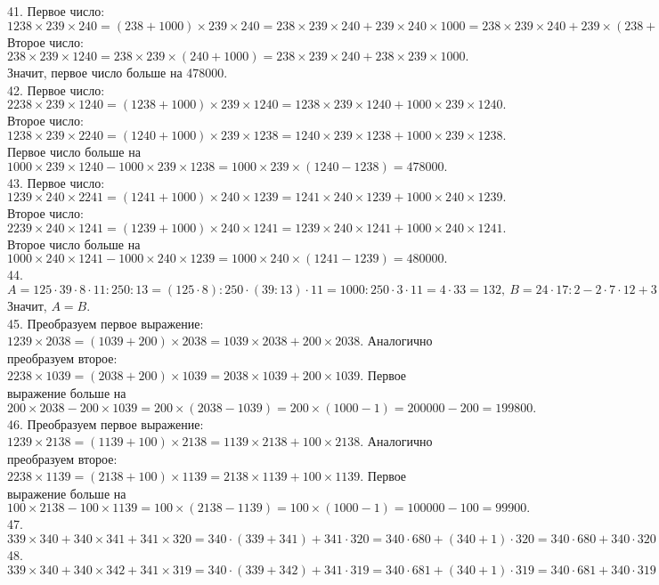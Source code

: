 41. Первое число: $1238\times239\times240=(238+1000)\times239\times240=238\times239\times240+239\times240\times1000=238\times239\times240+239\times(238+2)\times1000=
238\times239\times240+239\times238\times1000+239\times2\times1000=238\times239\times240+239\times238\times1000+478000.$ Второе число: $238\times239\times1240=238\times239\times(240+1000)=238\times239\times240+238\times239\times1000.$ Значит, первое число больше на 478000.\\
42. Первое число: $2238\times239\times1240=(1238+1000)\times239\times1240=
1238\times239\times1240+1000\times239\times1240.$ Второе число:
$1238\times239\times2240=(1240+1000)\times239\times1238=1240\times239\times1238+
1000\times239\times1238.$ Первое число больше на $1000\times239\times1240-1000\times239\times1238=1000\times239\times(1240-1238)=478000.$\\
43. Первое число: $1239\times240\times2241=(1241+1000)\times240\times1239=1241\times240\times1239+1000\times240\times1239.$ Второе число: $2239\times240\times1241=(1239+1000)\times240\times1241=
1239\times240\times1241+1000\times240\times1241.$ Второе число больше на
 $1000\times240\times1241-1000\times240\times1239=1000\times240\times(1241-1239)=480000.$\\
44. $A=125\cdot39\cdot8\cdot11:250:13=(125\cdot8):250\cdot(39:13)\cdot11=1000:250\cdot3\cdot11=4\cdot33=132,\ B=24\cdot17:2-2\cdot7\cdot12+3\cdot45\cdot4-(5+7)\cdot37=17\cdot12-14\cdot12+45\cdot12-37\cdot12=12\cdot(17-14+45-37)=12\cdot11=132.$ Значит, $A=B.$\\
45. Преобразуем первое выражение: $1239\times2038=(1039+200)\times2038=1039\times2038+200\times2038.$ Аналогично преобразуем второе:
$2238\times1039=(2038+200)\times1039=2038\times1039+200\times1039.$ Первое выражение больше на $200\times2038-200\times1039=
200\times(2038-1039)=200\times(1000-1)=200000-200=199800.$\\
46. Преобразуем первое выражение: $1239\times2138=(1139+100)\times2138=1139\times2138+100\times2138.$ Аналогично преобразуем второе:
$2238\times1139=(2138+100)\times1139=2138\times1139+100\times1139.$ Первое выражение больше на $100\times2138-100\times1139=
100\times(2138-1139)=100\times(1000-1)=100000-100=99900.$\\
47. $339 \times 340 + 340 \times 341 + 341 \times 320=
340\cdot(339+341)+341\cdot320=340\cdot680+(340+1)\cdot320=
340\cdot680+340\cdot320+1\cdot320=340\cdot(680+320)+320=
340\cdot1000+320=340320.$\\
48. $339 \times 340 + 340 \times 342 + 341 \times 319=
340\cdot(339+342)+341\cdot319=340\cdot681+(340+1)\cdot319=
340\cdot681+340\cdot319+1\cdot319=340\cdot(681+319)+319=
340\cdot1000+319=340319.$
\newpage
